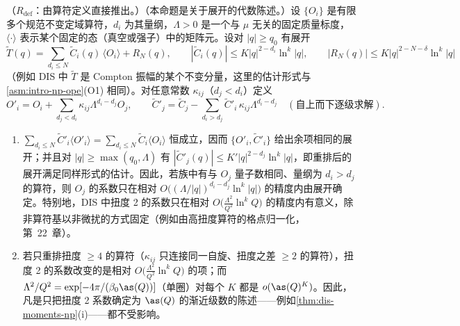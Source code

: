 \begin{proposition}\label{prop:power-rearrangement}
（$R_{\mathrm{def}}$：由算符定义直接推出。）（本命题是关于展开的代数陈述。）设 $\{O_i\}$ 是有限多个规范不变定域算符，$d_i$ 为其量纲，$\Lambda>0$ 是一个与 $\mu$ 无关的固定质量标度，$\langle\cdot\rangle$ 表示某个固定的态（真空或强子）中的矩阵元。设对 $|q|\ge q_0$ 有展开
\begin{equation}\label{eq:power-ope-N}
\tilde T(q)=\sum_{d_i\le N}\tilde C_i(q)\,\langle O_i\rangle+R_N(q),\qquad
|\tilde C_i(q)|\le K|q|^{2-d_i}\ln^k|q|,\qquad |R_N(q)|\le K|q|^{2-N-\delta}\ln^k|q|
\end{equation}
（例如 DIS 中 $\tilde T$ 是 Compton 振幅的某个不变分量，这里的估计形式与\cref{asm:intro-np-ope}(O1) 相同）。对任意常数 $\kappa_{ij}$（$d_j<d_i$）定义
\begin{equation}\label{eq:power-rearr}
O'_i=O_i+\sum_{d_j<d_i}\kappa_{ij}\Lambda^{d_i-d_j}O_j,\qquad
\tilde C'_j=\tilde C_j-\sum_{d_i>d_j}\tilde C'_i\,\kappa_{ij}\Lambda^{d_i-d_j}\quad(\text{自上而下逐级求解}).
\end{equation}
\begin{enumerate}[label=(\alph*),leftmargin=2em,itemsep=1pt,topsep=2pt]
\item $\sum_{d_i\le N}\tilde C'_i\langle O'_i\rangle=\sum_{d_i\le N}\tilde C_i\langle O_i\rangle$ 恒成立，因而 $\{O'_i,\tilde C'_i\}$ 给出余项相同的展开；并且对 $|q|\ge\max(q_0,\Lambda)$ 有 $|\tilde C'_j(q)|\le K'|q|^{2-d_j}\ln^k|q|$，即重排后的展开满足同样形式的估计。因此，若族中有与 $O_j$ 量子数相同、量纲为 $d_i>d_j$ 的算符，则 $O_j$ 的系数只在相对 $O\big((\Lambda/|q|)^{d_i-d_j}\ln^k|q|\big)$ 的精度内由展开确定。特别地，DIS 中扭度 2 的系数只在相对 $O\big(\frac{\Lambda^2}{Q^2}\ln^kQ\big)$ 的精度内有意义，除非算符基以非微扰的方式固定（例如由高扭度算符的格点归一化，第~22~章）。
\item 若只重排扭度 $\ge4$ 的算符（$\kappa_{ij}$ 只连接同一自旋、扭度之差 $\ge2$ 的算符），扭度 2 的系数改变的是相对 $O\big(\frac{\Lambda^2}{Q^2}\ln^kQ\big)$ 的项；而 $\Lambda^2/Q^2=\exp[-4\pi/(\beta_0\as(Q))]$（单圈）对每个 $K$ 都是 $o(\as(Q)^K)$。因此，凡是只把扭度 2 系数确定为 $\as(Q)$ 的渐近级数的陈述——例如\cref{thm:dis-moments-np}(i)——都不受影响。
\end{enumerate}
\end{proposition}

